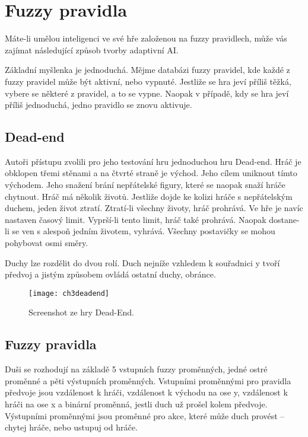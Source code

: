 \section{Fuzzy pravidla} \label{sec:fuzzy}

Máte-li umělou inteligenci ve své hře založenou na fuzzy pravidlech, může vás zajímat následující způsob tvorby adaptivní AI.

Základní myšlenka je jednoduchá. Mějme databázi fuzzy pravidel, kde každé z fuzzy pravidel může být aktivní, nebo vypnuté. Jestliže se hra jeví příliš těžká, vybere se některé z pravidel, a to se vypne. Naopak v případě, kdy se hra jeví příliš jednoduchá, jedno pravidlo se znovu aktivuje.

\subsection{Dead-end}

Autoři přístupu zvolili pro jeho testování hru jednoduchou hru Dead-end. Hráč je obklopen třemi stěnami a na čtvrté straně je východ. Jeho cílem uniknout tímto východem. Jeho snažení brání nepřátelské figury, které se naopak snaží hráče chytnout. Hráč má několik životů. Jestliže dojde ke kolizi hráče s nepřátelským duchem, jeden život ztratí. Ztratí-li všechny životy, hráč prohrává. Ve hře je navíc nastaven časový limit. Vyprší-li tento limit, hráč také prohrává. Naopak dostane-li se ven s alespoň jedním životem, vyhrává. Všechny postavičky se mohou pohybovat osmi směry.

Duchy lze rozdělit do dvou rolí. Duch nejníže vzhledem k souřadnici y tvoří předvoj a jistým způsobem ovládá ostatní duchy, obránce.

\begin{figure}
  \centering
  \texttt{[image: ch3deadend]}
	\caption{Screenshot ze hry Dead-End. \cite{25deadend} }
	\label{ch3deadend}
\end{figure}

\subsection{Fuzzy pravidla}

Duši se rozhodují na základě 5 vstupních fuzzy proměnných, jedné ostré proměnné a pěti výstupních proměnných.
Vstupními proměnnými pro pravidla předvoje jsou vzdálenost k hráči, vzdálenost k východu na ose y,  vzdálenost k hráči na ose x a binární proměnná, jestli duch už prošel kolem předvoje. Výstupními proměnnými jsou proměnné pro akce, které může duch provést – chytej hráče, nebo ustupuj od hráče.


